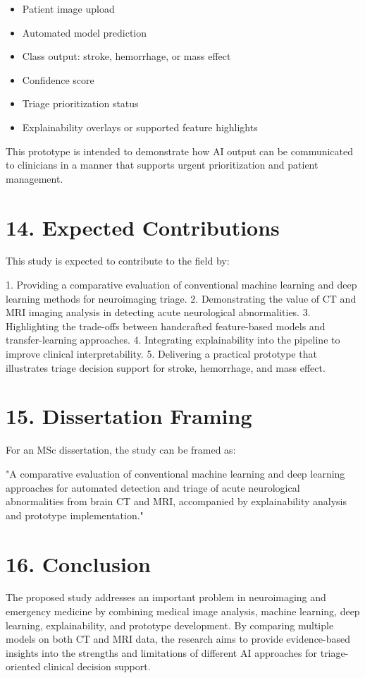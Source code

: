 \documentclass[12pt,a4paper]{report}
\begin{document}
\begin{itemize}
\item Patient image upload
\item Automated model prediction
\item Class output: stroke, hemorrhage, or mass effect
\item Confidence score
\item Triage prioritization status
\item Explainability overlays or supported feature highlights
\end{itemize}

This prototype is intended to demonstrate how AI output can be communicated to clinicians in a manner that supports urgent prioritization and patient management.


\section{14. Expected Contributions}

This study is expected to contribute to the field by:

1. Providing a comparative evaluation of conventional machine learning and deep learning methods for neuroimaging triage.
2. Demonstrating the value of CT and MRI imaging analysis in detecting acute neurological abnormalities.
3. Highlighting the trade-offs between handcrafted feature-based models and transfer-learning approaches.
4. Integrating explainability into the pipeline to improve clinical interpretability.
5. Delivering a practical prototype that illustrates triage decision support for stroke, hemorrhage, and mass effect.


\section{15. Dissertation Framing}

For an MSc dissertation, the study can be framed as:

"A comparative evaluation of conventional machine learning and deep learning approaches for automated detection and triage of acute neurological abnormalities from brain CT and MRI, accompanied by explainability analysis and prototype implementation."


\section{16. Conclusion}

The proposed study addresses an important problem in neuroimaging and emergency medicine by combining medical image analysis, machine learning, deep learning, explainability, and prototype development. By comparing multiple models on both CT and MRI data, the research aims to provide evidence-based insights into the strengths and limitations of different AI approaches for triage-oriented clinical decision support.
\end{document}
